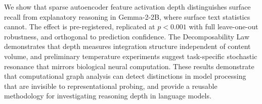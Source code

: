 \documentclass[10pt]{article}
\begin{document}
We show that sparse autoencoder feature activation depth distinguishes surface recall from explanatory reasoning in Gemma-2-2B, where surface text statistics cannot. The effect is pre-registered, replicated at $p < 0.001$ with full leave-one-out robustness, and orthogonal to prediction confidence. The Decomposability Law demonstrates that depth measures integration structure independent of content volume, and preliminary temperature experiments suggest task-specific stochastic resonance that mirrors biological neural computation. These results demonstrate that computational graph analysis can detect distinctions in model processing that are invisible to representational probing, and provide a reusable methodology for investigating reasoning depth in language models.



\end{document}
